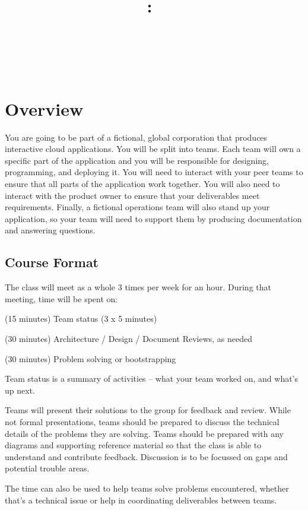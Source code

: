 \documentclass{article}
\title{
\vspace{2in}
\textmd{\textbf{\hmwkClass:\ \hmwkTitle}}\\
\normalsize\vspace{0.1in}\hmwkDueDate\\
\vspace{0.1in}\large{\textit{\hmwkClassInstructor\ \hmwkClassTime}}
\vspace{3in}
}
\author{\textbf{\hmwkAuthorName}}
\date{} %
\newcommand{\enterProblemHeader}[1]{
}
\newcommand{\exitProblemHeader}[1]{
\nobreak\extramarks{#1}{}\nobreak
}
\newcounter{homeworkProblemCounter} %
\newcommand{\homeworkProblemName}{}
\newenvironment{homeworkProblem}[1][Problem \arabic{homeworkProblemCounter}]{ %
\stepcounter{homeworkProblemCounter} %
\renewcommand{\homeworkProblemName}{#1} %
\section{\homeworkProblemName} %
\enterProblemHeader{\homeworkProblemName} %
}{
\exitProblemHeader{\homeworkProblemName} %
}
\newcommand{\homeworkSectionName}{}
\newenvironment{homeworkSection}[1]{ %
\renewcommand{\homeworkSectionName}{#1} %
\subsection{\homeworkSectionName} %
\enterProblemHeader{\homeworkProblemName\ [\homeworkSectionName]} %
}{
\enterProblemHeader{\homeworkProblemName} %
}
\begin{document}
\maketitle\thispagestyle{empty}

\begin{homeworkProblem}[Overview]

  You are going to be part of a fictional, global corporation that produces interactive cloud applications. You will be split into teams. Each team will own a specific part of the application and you will be responsible for designing, programming, and deploying it. You will need to interact with your peer teams to ensure that all parts of the application work together. You will also need to interact with the product owner to ensure that your deliverables meet requirements. Finally, a fictional operations team will also stand up your application, so your team will need to support them by producing documentation and answering questions.

\begin{homeworkSection}{Course Format}
  The class will meet as a whole 3 times per week for an hour. During that meeting, time will be spent on:
	\begin{compactitem}
		\item (15 minutes) Team status (3 x 5 minutes)
		\item (30 minutes) Architecture / Design / Document Reviews, as needed
		\item (30 minutes) Problem solving or bootstrapping
	\end{compactitem}

	Team status is a summary of activities -- what your team worked on, and what's up next.
	
	Teams will present their solutions to the group for feedback and review. While not formal presentations, teams should be prepared to discuss the technical details of the problems they are solving. Teams should be prepared with any diagrams and supporting reference material so that the class is able to understand and contribute feedback. Discussion is to be focussed on gaps and potential trouble areas.

	The time can also be used to help teams solve problems encountered, whether that's a technical issue or help in coordinating deliverables between teams.
	

\end{homeworkSection}
\end{homeworkProblem}
\end{document}
